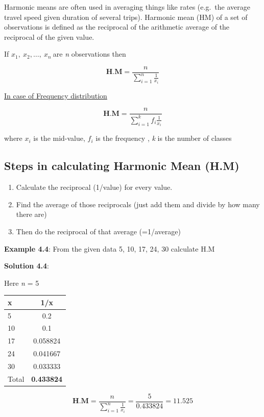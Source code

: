 \documentclass[
]{book}
\begin{document}
Harmonic means are often used in averaging things like rates (e.g.~the
average travel speed given duration of several trips). Harmonic mean
(HM) of a set of observations is defined as the reciprocal of the
arithmetic average of the reciprocal of the given value.

If \(x_{1},\ x_{2},\ldots,\ x_{n}\ \)are \emph{n} observations then

\[\mathbf{\text{H.M}} = \frac{n}{\sum_{i = 1}^{n}\frac{1}{x_{i}}}\]

\underline{In case of Frequency distribution}

\[\mathbf{\text{H.M}} = \frac{n}{\sum_{i = 1}^{k}{f_{i}\frac{1}{x_{i}}}}\]

where \(x_{i}\) is the mid-value, \(f_{i}\) is the frequency , \emph{k} is the
number of classes

\hypertarget{steps-in-calculating-harmonic-mean-h.m}{%
\subsection{Steps in calculating Harmonic Mean (H.M)}\label{steps-in-calculating-harmonic-mean-h.m}}

\begin{enumerate}
\def\labelenumi{\arabic{enumi}.}
\item
  Calculate the reciprocal (1/value) for every value.
\item
  Find the average of those reciprocals (just add them and divide by
  how many there are)
\item
  Then do the reciprocal of that average (=1/average)
\end{enumerate}

\textbf{Example 4.4}: From the given data 5, 10, 17, 24, 30 calculate H.M

\textbf{Solution 4.4}:

Here \emph{n} = 5

\begin{longtable}[]{@{}lc@{}}
\toprule
x & 1/x \\
\midrule
\endhead
5 & 0.2 \\
10 & 0.1 \\
17 & 0.058824 \\
24 & 0.041667 \\
30 & 0.033333 \\
Total & \textbf{0.433824} \\
\bottomrule
\end{longtable}

\[\mathbf{\text{H.M}} = \frac{n}{\sum_{i = 1}^{n}\frac{1}{x_{i}}} = \frac{5}{0.433824} = 11.525\]
\end{document}

